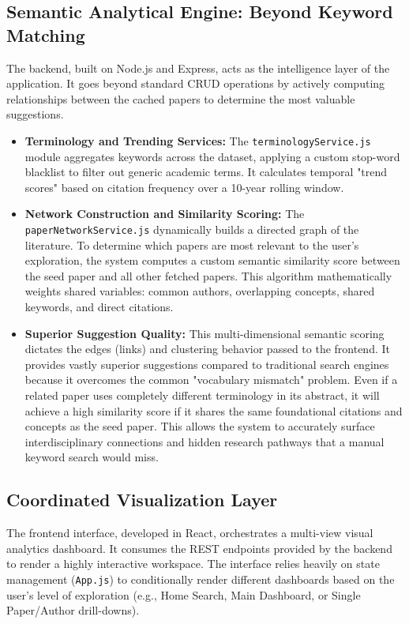 \documentclass[sigconf]{acmart}
\begin{document}
\subsection{Semantic Analytical Engine: Beyond Keyword Matching}
The backend, built on Node.js and Express, acts as the intelligence layer of the application. It goes beyond standard CRUD operations by actively computing relationships between the cached papers to determine the most valuable suggestions.
\begin{itemize}
    \item \textbf{Terminology and Trending Services:} The \texttt{terminologyService.js} module aggregates keywords across the dataset, applying a custom stop-word blacklist to filter out generic academic terms. It calculates temporal "trend scores" based on citation frequency over a 10-year rolling window.
    \item \textbf{Network Construction and Similarity Scoring:} The \texttt{paperNetworkService.js} dynamically builds a directed graph of the literature. To determine which papers are most relevant to the user's exploration, the system computes a custom semantic similarity score between the seed paper and all other fetched papers. This algorithm mathematically weights shared variables: common authors, overlapping concepts, shared keywords, and direct citations.
    \item \textbf{Superior Suggestion Quality:} This multi-dimensional semantic scoring dictates the edges (links) and clustering behavior passed to the frontend. It provides vastly superior suggestions compared to traditional search engines because it overcomes the common "vocabulary mismatch" problem. Even if a related paper uses completely different terminology in its abstract, it will achieve a high similarity score if it shares the same foundational citations and concepts as the seed paper. This allows the system to accurately surface interdisciplinary connections and hidden research pathways that a manual keyword search would miss.
\end{itemize}

\subsection{Coordinated Visualization Layer}
The frontend interface, developed in React, orchestrates a multi-view visual analytics dashboard. It consumes the REST endpoints provided by the backend to render a highly interactive workspace. The interface relies heavily on state management (\texttt{App.js}) to conditionally render different dashboards based on the user's level of exploration (e.g., Home Search, Main Dashboard, or Single Paper/Author drill-downs). 
\end{document}
